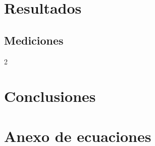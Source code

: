 \documentclass[letterpaper,12pt]{extarticle}%
\begin{document}
    	
    \section{Resultados}
	\subsection{Mediciones}

	\begin{multicols}{2}
	    
	    \section{Conclusiones}
	        \nocite{Cengel}
	        
            
    \end{multicols}
    
	\newpage
	
	\section{Anexo de ecuaciones}
	\cfoot{\LaTeX}
\end{document}
